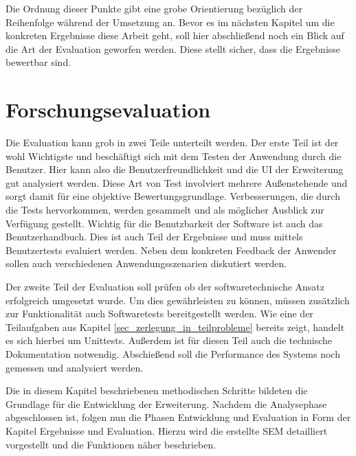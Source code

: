 Die Ordnung dieser Punkte gibt eine grobe Orientierung bezüglich der Reihenfolge
während der Umsetzung an. Bevor es im nächsten Kapitel um die konkreten
Ergebnisse diese Arbeit geht, soll hier abschließend noch ein Blick auf die Art der
Evaluation geworfen werden. Diese stellt sicher, dass die Ergebnisse bewertbar sind.

\section{Forschungsevaluation}
Die Evaluation kann grob in zwei Teile unterteilt werden. Der erste Teil ist der
wohl Wichtigste und beschäftigt sich mit dem Testen der Anwendung durch die
Benutzer. Hier kann also die Benutzerfreundlichkeit und die \ac{UI} der
Erweiterung gut analysiert werden. Diese Art von Test involviert mehrere Außenstehende
und sorgt damit für eine objektive Bewertungsgrundlage. Verbesserungen, die durch
die Tests hervorkommen, werden gesammelt und als möglicher Ausblick zur
Verfügung gestellt. Wichtig für die Benutzbarkeit der Software ist auch das Benutzerhandbuch.
Dies ist auch Teil der Ergebnisse und muss mittels Benutzertests evaluiert
werden. Neben dem konkreten Feedback der Anwender sollen auch verschiedenen Anwendungsszenarien
diskutiert werden.

Der zweite Teil der Evaluation soll prüfen ob der softwaretechnische Ansatz erfolgreich
umgesetzt wurde. Um dies gewährleisten zu können, müssen zusätzlich zur Funktionalität
auch Softwaretests bereitgestellt werden. Wie eine der Teilaufgaben aus Kapitel
\ref{sec_zerlegung_in_teilprobleme} bereits zeigt, handelt es sich hierbei um Unittests.
Außerdem ist für diesen Teil auch die technische Dokumentation notwendig. Abschießend
soll die Performance des Systems noch gemessen und analysiert werden.

Die in diesem Kapitel beschriebenen methodischen Schritte bildeten die Grundlage
für die Entwicklung der Erweiterung. Nachdem die Analysephase abgeschlossen ist,
folgen nun die Phasen Entwicklung und Evaluation in Form der Kapitel Ergebnisse und
Evaluation. Hierzu wird die erstellte \ac{SEM} detailliert vorgestellt und die Funktionen
näher beschrieben.
